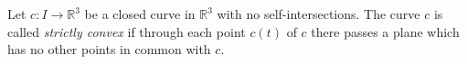 Let $c: I \to \mathbb{R}^3$ be a closed curve in $\mathbb{R}^3$ with no self-intersections. The curve $c$ is called \emph{strictly convex} if through each point $c(t)$ of $c$ there passes a plane which has no other points in common with $c$.
